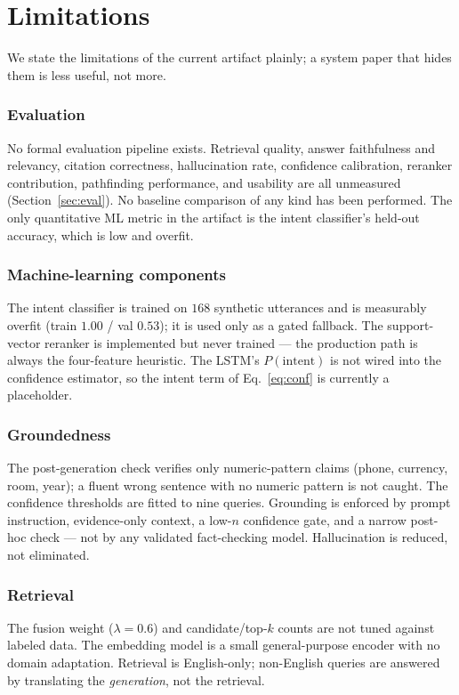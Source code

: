 \section{Limitations}
\label{sec:limitations}
We state the limitations of the current artifact plainly; a system paper
that hides them is less useful, not more.

\subsubsection*{Evaluation}
No formal evaluation pipeline exists. Retrieval quality, answer
faithfulness and relevancy, citation correctness, hallucination rate,
confidence calibration, reranker contribution, pathfinding performance, and
usability are all unmeasured (Section~\ref{sec:eval}). No baseline
comparison of any kind has been performed. The only quantitative ML metric
in the artifact is the intent classifier's held-out accuracy, which is
low and overfit.

\subsubsection*{Machine-learning components}
The intent classifier is trained on $168$ synthetic utterances and is
measurably overfit (train $1.00$ / val $0.53$); it is used only as a gated
fallback. The support-vector reranker is implemented but never trained ---
the production path is always the four-feature heuristic. The LSTM's
$P(\text{intent})$ is not wired into the confidence estimator, so the
intent term of Eq.~\eqref{eq:conf} is currently a placeholder.

\subsubsection*{Groundedness}
The post-generation check verifies only numeric-pattern claims (phone,
currency, room, year); a fluent wrong sentence with no numeric pattern is
not caught. The confidence thresholds are fitted to nine queries. Grounding
is enforced by prompt instruction, evidence-only context, a low-$n$
confidence gate, and a narrow post-hoc check --- not by any validated
fact-checking model. Hallucination is reduced, not eliminated.

\subsubsection*{Retrieval}
The fusion weight ($\lambda = 0.6$) and candidate/top-$k$ counts are not
tuned against labeled data. The embedding model is a small general-purpose
encoder with no domain adaptation. Retrieval is English-only; non-English
queries are answered by translating the \emph{generation}, not the
retrieval.

